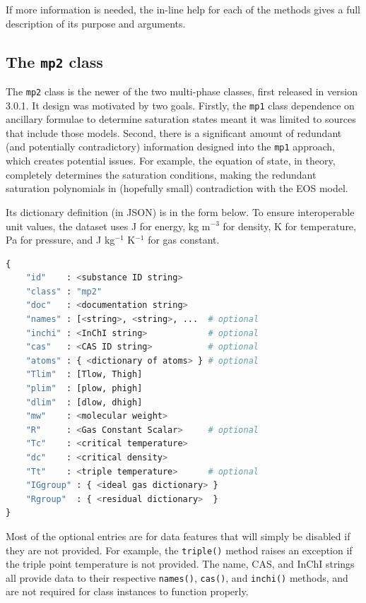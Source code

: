 If more information is needed, the in-line help for each of the methods gives a full description of its purpose and arguments.

\subsection{The \texttt{mp2} class}

The \texttt{mp2} class is the newer of the two multi-phase classes, first released in version 3.0.1.  It design was motivated by two goals.  Firstly, the \texttt{mp1} class dependence on ancillary formulae to determine saturation states meant it was limited to sources that include those models.  Second, there is a significant amount of redundant (and potentially contradictory) information designed into the \texttt{mp1} approach, which creates potential issues.  For example, the equation of state, in theory, completely determines the saturation conditions, making the redundant saturation polynomials in (hopefully small) contradiction with the EOS model.

Its dictionary definition (in JSON) is in the form below.  To ensure interoperable unit values, the dataset uses J for energy, kg m$^{-3}$ for density, K for temperature, Pa for pressure, and J kg$^{-1}$ K$^{-1}$ for gas constant.

\begin{lstlisting}[language=Python]
{
    "id"    : <substance ID string>
    "class" : "mp2"
    "doc"   : <documentation string>
    "names" : [<string>, <string>, ...  # optional
    "inchi" : <InChI string>            # optional
    "cas"   : <CAS ID string>           # optional
    "atoms" : { <dictionary of atoms> } # optional
    "Tlim"  : [Tlow, Thigh]
    "plim"  : [plow, phigh]
    "dlim"  : [dlow, dhigh]
    "mw"    : <molecular weight>
    "R"     : <Gas Constant Scalar>     # optional
    "Tc"    : <critical temperature>
    "dc"    : <critical density>
    "Tt"    : <triple temperature>      # optional
    "IGgroup" : { <ideal gas dictionary> }
    "Rgroup"  : { <residual dictionary>  }
}
\end{lstlisting}

Most of the optional entries are for data features that will simply be disabled if they are not provided.  For example, the \texttt{triple()} method raises an exception if the triple point temperature is not provided.  The name, CAS, and InChI strings all provide data to their respective \texttt{names()}, \texttt{cas()}, and \texttt{inchi()} methods, and are not required for class instances to function properly.  

